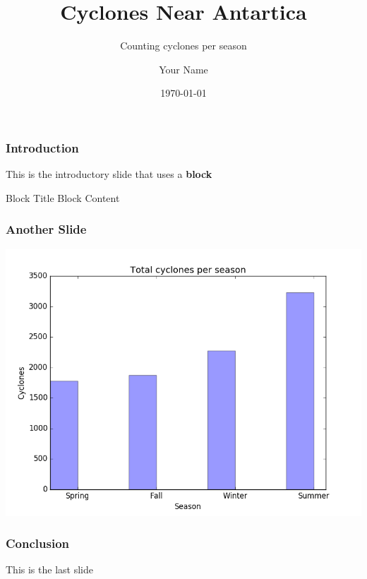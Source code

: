 \documentclass{beamer}
\title{Cyclones Near Antartica}
\subtitle{Counting cyclones per season}
\author{Your Name}
\institute{UC Berkeley}
\date{\today}
\begin{document}

\begin{frame}
\titlepage   %
\end{frame}


\begin{frame}
\frametitle{Introduction}
This is the introductory slide that uses a \textbf{block}

\begin{block}{Block Title}
Block Content
\end{block}

\end{frame}


\begin{frame}
\frametitle{Another Slide}
\includegraphics[scale=0.4]{../images/barchart_cyclones.png}
\end{frame}


\begin{frame}
\frametitle{Conclusion}
This is the last slide
\end{frame}

\end{document}
